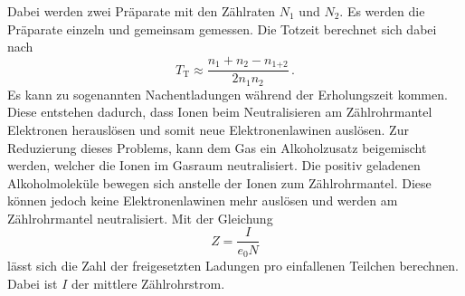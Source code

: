 Dabei werden zwei Präparate mit den Zählraten $N_1$ und $N_2$. Es werden die Präparate einzeln und gemeinsam gemessen.
Die Totzeit berechnet sich dabei nach
\begin{equation}
  T_\text{T} \approx \frac{n_1 +n_2 -n_\text{1+2}}{2n_1 n_2} \, .
  \label{eqn:totzeit}
\end{equation}
Es kann zu sogenannten Nachentladungen während der Erholungszeit kommen. Diese entstehen dadurch, dass Ionen beim Neutralisieren am Zählrohrmantel
Elektronen herauslösen und somit neue Elektronenlawinen auslösen. Zur Reduzierung dieses Problems, kann dem Gas ein Alkoholzusatz beigemischt werden, welcher die 
Ionen im Gasraum neutralisiert. Die positiv geladenen Alkoholmoleküle bewegen sich anstelle der Ionen zum Zählrohrmantel. Diese können jedoch keine Elektronenlawinen mehr auslösen und werden am Zählrohrmantel neutralisiert.
Mit der Gleichung 
\begin{equation}
  Z=\frac{I}{e_0 N}
  \label{eqn:zstrom}
\end{equation}
lässt sich die Zahl der freigesetzten Ladungen pro einfallenen Teilchen berechnen. Dabei ist $I$ der mittlere Zählrohrstrom.